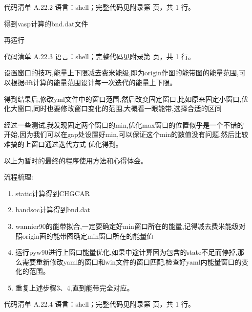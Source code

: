 \documentclass[lang=cn,scheme=chinese,color=blue,device=normal,toc=onecol,math=cm]{elegantbook}
\begin{document}
\begin{codeindexbox}{代码清单 A.22.2}
语言：shell；完整代码见附录第 \pageref{code:22:2} 页，共 1 行。
\end{codeindexbox}


得到vasp计算的bnd.dat文件\par


再运行\par


\begin{codeindexbox}{代码清单 A.22.3}
语言：shell；完整代码见附录第 \pageref{code:22:3} 页，共 1 行。
\end{codeindexbox}


设置窗口的技巧,能量上下限减去费米能级,即为origin作图的能带图的能量范围,可以根据dft计算的能量范围设计每一次迭代的能量上下限。\par


得到结果后,修改yml文件中的窗口范围,然后改变固定窗口,比如原来固定小窗口,优化大窗口,同时也要修改窗口变化的范围,大概看一眼能带,选择合适的区间\par


经过一些测试,我发现固定两个窗口的min,优化max窗口的位置似乎是一个不错的开始,因为我们可以在gap处设置好min,可以保证这个min的数值没有问题,然后比较难搞的上窗口通过迭代方式 优化得到。\par


以上为暂时的最终的程序使用方法和心得体会。\par


流程梳理:\par


\begin{enumerate}
\item static计算得到CHGCAR\par
\item bandsoc计算得到bnd.dat\par
\item wannier90的能带拟合,一定要确定好min窗口所在的能量,记得减去费米能级对照origin画的能带图确定min窗口所在的能量值\par
\item 运行pyw90进行上窗口能量优化,如果中途计算因为包含的state不足而停掉,那么需要重新修改yaml的窗口和win文件的窗口匹配,检查好yaml内能量窗口的变化的范围。\par
\item 重复上述步骤3、4,直到能带完全对应。\par
\end{enumerate}


\begin{codeindexbox}{代码清单 A.22.4}
语言：shell；完整代码见附录第 \pageref{code:22:4} 页，共 1 行。
\end{codeindexbox}
\end{document}
